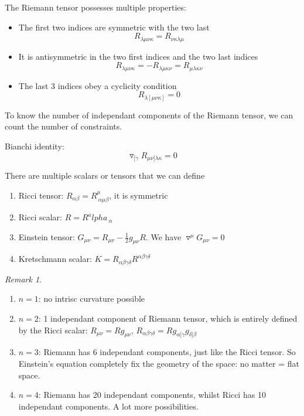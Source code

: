 \documentclass[a4paper]{book}
\theoremstyle{definition}
\theoremstyle{remark}
\newtheorem*{remark}{Remark}
\begin{document}
\noindent The Riemann tensor possesses multiple properties: 
\begin{itemize}
    \item The first two indices are symmetric with the two last
    \begin{equation}
        R_{\lambda \mu\nu\kappa} = R_{\nu\kappa\lambda\mu}
    \end{equation}
    \item It is antisymmetric in the two first indices and the two last indices
    \begin{equation}
        R_{\lambda \mu\nu\kappa} = - R_{\lambda \mu\kappa\nu} = R_{\mu\lambda\kappa\nu}
    \end{equation}
    \item The last 3 indices obey a cyclicity condition 
    \begin{equation}
        R_{\lambda [\mu\nu\kappa]} = 0
    \end{equation}
\end{itemize}

To know the number of independant components of the Riemann tensor, we can count the number of constraints. 


Bianchi identity:
\begin{equation}
    \triangledown_{[\gamma}R_{\mu\nu]\lambda\kappa} = 0
\end{equation}

There are multiple scalars or tensors that we can define 
\begin{enumerate}
    \item Ricci tensor: $R_{\alpha\beta} = R^\mu_{~\alpha\mu\beta}$, it is symmetric
    \item Ricci scalar: $R = R^alpha_{~\alpha}$
    \item Einstein tensor: $G_{\mu\nu} = R_{\mu\nu} - \frac{1}{2}g_{\mu\nu}R$. We have $\triangledown^\mu G_{\mu\nu} = 0$
    \item Kretschmann scalar: $K = R_{\alpha\beta\gamma\delta}R^{\alpha\beta\gamma\delta}$
\end{enumerate}

\begin{remark}
    \begin{enumerate}
        \item $n = 1$: no intrisc curvature possible 
        \item $n=2$: 1 independant component of Riemann tensor, which is entirely defined by the Ricci scalar: $R_{\mu\nu} = Rg_{\mu\nu}$, $R_{\alpha\beta\gamma\delta} = R g_{\alpha[\gamma}g_{\delta]\beta}$
        \item $n=3$: Riemann has 6 independant components, just like the Ricci tensor. So Einstein's equation completely fix the geometry of the space: no matter = flat space. 
        \item $n=4$: Riemann has 20 independant components, whilst Ricci has 10 independant components. A lot more possibilities. 
    \end{enumerate}
\end{remark}
\end{document}
